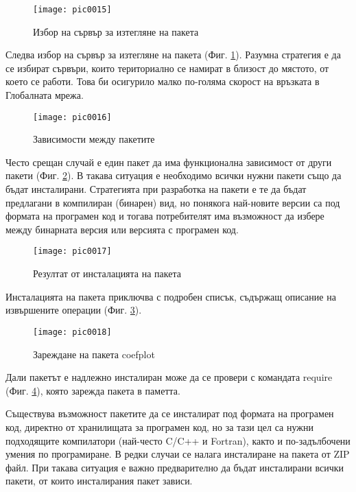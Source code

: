 \begin{figure}[h!]
  \centering
  \texttt{[image: pic0015]}
  \caption{Избор на сървър за изтегляне на пакета}
\label{figure0015}
\end{figure}
\FloatBarrier

Следва избор на сървър за изтегляне на пакета (Фиг. \ref{figure0015}). Разумна стратегия е да се избират сървъри, които териториално се намират в близост до мястото, от което се работи. Това би осигурило малко по-голяма скорост на връзката в Глобалната мрежа.

\begin{figure}[h!]
  \centering
  \texttt{[image: pic0016]}
  \caption{Зависимости между пакетите}
\label{figure0016}
\end{figure}
\FloatBarrier

Често срещан случай е един пакет да има функционална зависимост от други пакети (Фиг. \ref{figure0016}). В такава ситуация е необходимо всички нужни пакети също да бъдат инсталирани. Стратегията при разработка на пакети е те да бъдат предлагани в компилиран (бинарен) вид, но понякога най-новите версии са под формата на програмен код и тогава потребителят има възможност да избере между бинарната версия или версията с програмен код.

\begin{figure}[h!]
  \centering
  \texttt{[image: pic0017]}
  \caption{Резултат от инсталацията на пакета}
\label{figure0017}
\end{figure}
\FloatBarrier

Инсталацията на пакета приключва с подробен списък, съдържащ описание на извършените операции (Фиг. \ref{figure0017}).

\begin{figure}[h!]
  \centering
  \texttt{[image: pic0018]}
  \caption{Зареждане на пакета coefplot}
\label{figure0018}
\end{figure}
\FloatBarrier

Дали пакетът е надлежно инсталиран може да се провери с командата require (Фиг. \ref{figure0018}), която зарежда пакета в паметта.

Съществува възможност пакетите да се инсталират под формата на програмен код, директно от хранилищата за програмен код, но за тази цел са нужни подходящите компилатори (най-често C/C++ и Fortran), както и по-задълбочени умения по програмиране. В редки случаи се налага инсталиране на пакета от ZIP файл. При такава ситуация е важно предварително да бъдат инсталирани всички пакети, от които инсталирания пакет зависи.

